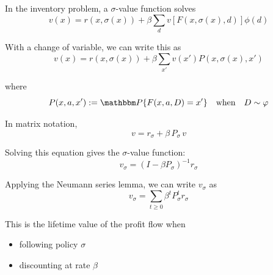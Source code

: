 \begin{frame}
    
    \Eg In the inventory problem, a $\sigma$-value function solves 
    \begin{equation*}
        v(x)
        = r(x, \sigma(x))
                + \beta
                \sum_d v [F(x, \sigma(x), d) ] \phi(d)
    \end{equation*}

              \vspace{0.5em}
    With a change of variable, we can write this as
    \begin{equation*}
        v(x)
        = r(x, \sigma(x))
                + \beta
                \sum_{x'} v (x') P(x, \sigma(x), x') 
    \end{equation*}

    where
    \begin{equation*}
        P(x, a, x') := \PP\{ F(x,a,D) = x' \}
        \quad \text{when} \quad
        D \sim \phi
    \end{equation*}

              \vspace{0.5em}
    In matrix notation,
    \begin{equation*}
        v = r_\sigma + \beta \, P_\sigma \, v
    \end{equation*}

\end{frame}

\begin{frame}
    
    Solving this equation gives the $\sigma$-value function:
    \begin{equation*}
        v_\sigma = (I - \beta P_\sigma)^{-1} r_\sigma
    \end{equation*}

              \vspace{0.5em}
              \vspace{0.5em}
    Applying the Neumann series lemma, we can write $v_\sigma$ as
    \begin{equation*}
        v_\sigma = \sum_{t \geq 0} \beta^t P_\sigma^t r_\sigma
    \end{equation*}

              \vspace{0.5em}
              \vspace{0.5em}
    This is the lifetime value of the profit flow when 
    \begin{itemize}
        \item following policy $\sigma$
              \vspace{0.5em}
        \item discounting at rate $\beta$
    \end{itemize}

\end{frame}

